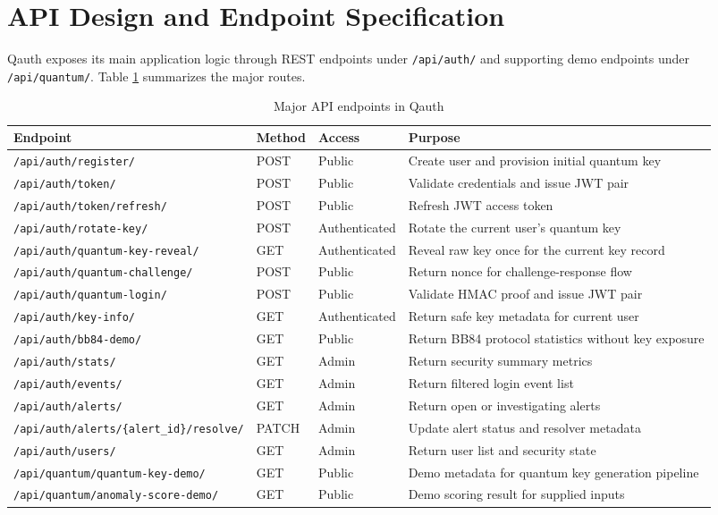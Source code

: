 \section{API Design and Endpoint Specification}
Qauth exposes its main application logic through REST endpoints under \texttt{/api/auth/} and supporting demo endpoints under \texttt{/api/quantum/}. Table \ref{tab:api-endpoints} summarizes the major routes.

\begin{table}[H]
\centering
\scriptsize
\caption{Major API endpoints in Qauth}
\label{tab:api-endpoints}
\begin{tabular}{|p{3.7cm}|p{1.2cm}|p{2.3cm}|p{7.0cm}|}
\hline
\textbf{Endpoint} & \textbf{Method} & \textbf{Access} & \textbf{Purpose} \\
\hline
\texttt{/api/auth/register/} & POST & Public & Create user and provision initial quantum key \\
\hline
\texttt{/api/auth/token/} & POST & Public & Validate credentials and issue JWT pair \\
\hline
\texttt{/api/auth/token/refresh/} & POST & Public & Refresh JWT access token \\
\hline
\texttt{/api/auth/rotate-key/} & POST & Authenticated & Rotate the current user's quantum key \\
\hline
\texttt{/api/auth/quantum-key-reveal/} & GET & Authenticated & Reveal raw key once for the current key record \\
\hline
\texttt{/api/auth/quantum-challenge/} & POST & Public & Return nonce for challenge-response flow \\
\hline
\texttt{/api/auth/quantum-login/} & POST & Public & Validate HMAC proof and issue JWT pair \\
\hline
\texttt{/api/auth/key-info/} & GET & Authenticated & Return safe key metadata for current user \\
\hline
\texttt{/api/auth/bb84-demo/} & GET & Public & Return BB84 protocol statistics without key exposure \\
\hline
\texttt{/api/auth/stats/} & GET & Admin & Return security summary metrics \\
\hline
\texttt{/api/auth/events/} & GET & Admin & Return filtered login event list \\
\hline
\texttt{/api/auth/alerts/} & GET & Admin & Return open or investigating alerts \\
\hline
\texttt{/api/auth/alerts/\{alert\_id\}/resolve/} & PATCH & Admin & Update alert status and resolver metadata \\
\hline
\texttt{/api/auth/users/} & GET & Admin & Return user list and security state \\
\hline
\texttt{/api/quantum/quantum-key-demo/} & GET & Public & Demo metadata for quantum key generation pipeline \\
\hline
\texttt{/api/quantum/anomaly-score-demo/} & GET & Public & Demo scoring result for supplied inputs \\
\hline
\end{tabular}
\end{table}

